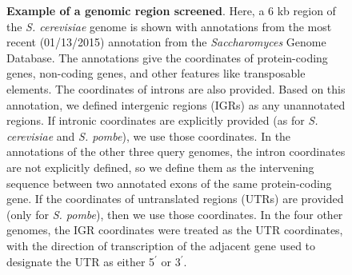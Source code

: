 \documentclass[12pt]{report}
\begin{document}
\begin{figure}
	\caption[Example of a genomic region screened]{\textbf{Example of a genomic region screened}. Here, a 6 kb region of the \textit{S. cerevisiae} genome is shown with annotations from the most recent (01/13/2015) annotation from the \textit{Saccharomyces} Genome Database. The annotations give the coordinates of protein-coding genes, non-coding genes, and other features like transposable elements. The coordinates of introns are also provided. Based on this annotation, we defined intergenic regions (IGRs) as any unannotated regions. If intronic coordinates are explicitly provided (as for \textit{S. cerevisiae} and \textit{S. pombe}), we use those coordinates. In the annotations of the other three query genomes, the intron coordinates are not explicitly defined, so we define them as the intervening sequence between two annotated exons of the same protein-coding gene. If the coordinates of untranslated regions (UTRs) are provided (only for \textit{S. pombe}), then we use those coordinates. In the four other genomes, the IGR coordinates were treated as the UTR coordinates, with the direction of transcription of the adjacent gene used to designate the UTR as either 5$^\prime$ or 3$^\prime$.}
	\label{fig:S4}
\end{figure}

\newpage
\end{document}
